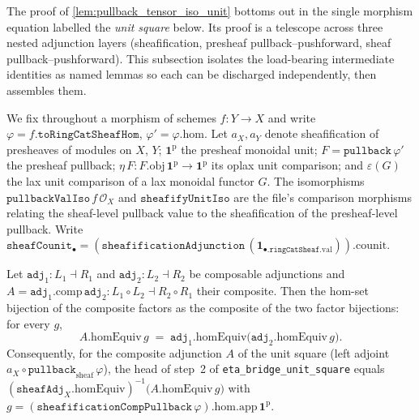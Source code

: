 The proof of \cref{lem:pullback_tensor_iso_unit} bottoms out in the single morphism equation
labelled the \emph{unit square} below. Its proof is a telescope across three nested adjunction
layers (sheafification, presheaf pullback--pushforward, sheaf pullback--pushforward). This
subsection isolates the load-bearing intermediate identities as named lemmas so each can be
discharged independently, then assembles them.

We fix throughout a morphism of schemes \(f : Y \to X\) and write
\(\varphi = f.\mathtt{toRingCatSheafHom}\), \(\varphi' = \varphi.\mathrm{hom}\). Let \(a_X, a_Y\)
denote sheafification of presheaves of modules on \(X\), \(Y\); \(\mathbf{1}^{\mathrm{p}}\) the
presheaf monoidal unit; \(F = \mathtt{pullback}\,\varphi'\) the presheaf pullback;
\(\eta\,F : F.\mathrm{obj}\,\mathbf{1}^{\mathrm{p}} \to \mathbf{1}^{\mathrm{p}}\) its oplax unit
comparison; and \(\varepsilon(G)\) the lax unit comparison of a lax monoidal functor \(G\). The
isomorphisms \(\mathtt{pullbackValIso}\,f\,\mathcal{O}_X\) and \(\mathtt{sheafifyUnitIso}\) are
the file's comparison morphisms relating the sheaf-level pullback value to the sheafification of
the presheaf-level pullback. Write
\(\mathtt{sheafCounit}_\bullet = (\mathtt{sheafificationAdjunction}\,(\mathbf{1}_{\bullet.\mathtt{ringCatSheaf}.\mathrm{val}})).\mathrm{counit}\).

\begin{lemma}
  \label{lem:comp_homequiv_factor_sheafify_pullback}
  Let \(\mathtt{adj}_1 : L_1 \dashv R_1\) and \(\mathtt{adj}_2 : L_2 \dashv R_2\) be composable
  adjunctions and \(A = \mathtt{adj}_1.\mathrm{comp}\,\mathtt{adj}_2 : L_1 \circ L_2 \dashv
  R_2 \circ R_1\) their composite. Then the hom-set bijection of the composite factors as the
  composite of the two factor bijections: for every \(g\),
  \[
    A.\mathrm{homEquiv}\,g
      \;=\;
    \mathtt{adj}_1.\mathrm{homEquiv}\bigl(\mathtt{adj}_2.\mathrm{homEquiv}\,g\bigr).
  \]
  Consequently, for the composite adjunction \(A\) of the unit square (left adjoint
  \(a_X \circ \mathtt{pullback}_{\mathrm{sheaf}}\,\varphi\)), the head of step~2 of
  \texttt{eta\_bridge\_unit\_square} equals
  \((\mathtt{sheafAdj}_X.\mathrm{homEquiv})^{-1}\bigl(A.\mathrm{homEquiv}\,g\bigr)\) with
  \(g = (\mathtt{sheafificationCompPullback}\,\varphi).\mathrm{hom}.\mathrm{app}\,\mathbf{1}^{\mathrm{p}}\).
\end{lemma}

